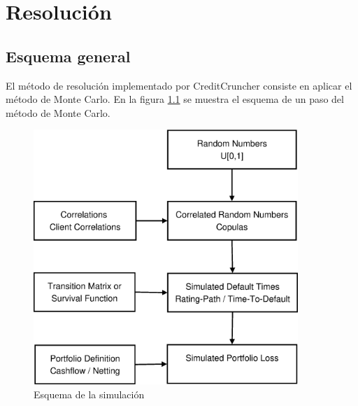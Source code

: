 
%
%
%
%
%
%
%
%

\chapter{Resoluci\'on}
\label{sec:resolution}

\section{Esquema general}

El m\'etodo de resoluci\'on implementado por CreditCruncher consiste en
aplicar el m\'etodo de Monte Carlo. En la figura \ref{fig:esquema1} se
muestra el esquema de un paso del m\'etodo de Monte Carlo.

\begin{figure}[!hb]
\begin{center}
\includegraphics[width=10cm,angle=0]{./images/esquema1.eps}
\caption{Esquema de la simulaci\'on}
\label{fig:esquema1}
\end{center}
\end{figure}

